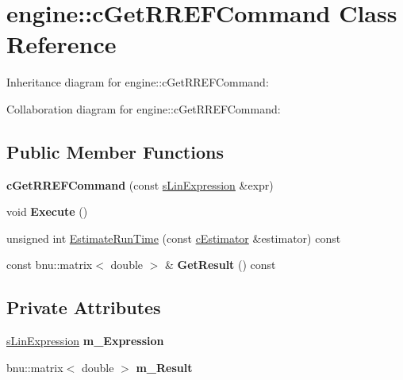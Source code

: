 \hypertarget{classengine_1_1cGetRREFCommand}{\section{engine\-:\-:c\-Get\-R\-R\-E\-F\-Command Class Reference}
\label{classengine_1_1cGetRREFCommand}
}


Inheritance diagram for engine\-:\-:c\-Get\-R\-R\-E\-F\-Command\-:


Collaboration diagram for engine\-:\-:c\-Get\-R\-R\-E\-F\-Command\-:
\subsection*{Public Member Functions}
\begin{DoxyCompactItemize}
\item 
\hypertarget{classengine_1_1cGetRREFCommand_a5eff470afe650d5ed4ca5b5e20d158b8}{{\bfseries c\-Get\-R\-R\-E\-F\-Command} (const \hyperlink{structengine_1_1sLinExpression}{s\-Lin\-Expression} \&expr)}\label{classengine_1_1cGetRREFCommand_a5eff470afe650d5ed4ca5b5e20d158b8}

\item 
\hypertarget{classengine_1_1cGetRREFCommand_af31735b5a154fe9ab5c850ac2f9e6bcc}{void {\bfseries Execute} ()}\label{classengine_1_1cGetRREFCommand_af31735b5a154fe9ab5c850ac2f9e6bcc}

\item 
unsigned int \hyperlink{classengine_1_1cGetRREFCommand_ac2bf1ab437a8e977986c73f5cd85ac3c}{Estimate\-Run\-Time} (const \hyperlink{classengine_1_1cEstimator}{c\-Estimator} \&estimator) const 
\item 
\hypertarget{classengine_1_1cGetRREFCommand_a3a8b9d2861a362d3941ef77f22b11524}{const bnu\-::matrix$<$ double $>$ \& {\bfseries Get\-Result} () const }\label{classengine_1_1cGetRREFCommand_a3a8b9d2861a362d3941ef77f22b11524}

\end{DoxyCompactItemize}
\subsection*{Private Attributes}
\begin{DoxyCompactItemize}
\item 
\hypertarget{classengine_1_1cGetRREFCommand_a65bbc8e49e68c64baa8536351eef856e}{\hyperlink{structengine_1_1sLinExpression}{s\-Lin\-Expression} {\bfseries m\-\_\-\-Expression}}\label{classengine_1_1cGetRREFCommand_a65bbc8e49e68c64baa8536351eef856e}

\item 
\hypertarget{classengine_1_1cGetRREFCommand_aabd97349311c475cc70390a176fd662f}{bnu\-::matrix$<$ double $>$ {\bfseries m\-\_\-\-Result}}\label{classengine_1_1cGetRREFCommand_aabd97349311c475cc70390a176fd662f}

\end{DoxyCompactItemize}


